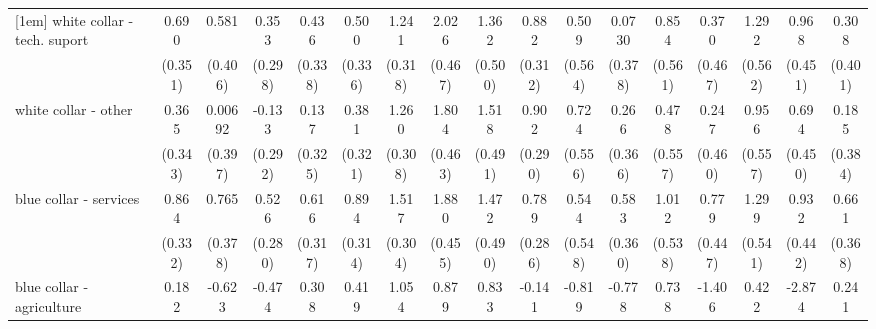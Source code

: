{\begin{tabular}{l*{16}{c}}
[1em]
white collar - tech. suport&       0.690\sym{*}  &       0.581         &       0.353         &       0.436         &       0.500         &       1.241\sym{***}&       2.026\sym{***}&       1.362\sym{**} &       0.882\sym{**} &       0.509         &      0.0730         &       0.854         &       0.370         &       1.292\sym{*}  &       0.968\sym{*}  &       0.308         \\
                    &     (0.351)         &     (0.406)         &     (0.298)         &     (0.338)         &     (0.336)         &     (0.318)         &     (0.467)         &     (0.500)         &     (0.312)         &     (0.564)         &     (0.378)         &     (0.561)         &     (0.467)         &     (0.562)         &     (0.451)         &     (0.401)         \\
[1em]
white collar - other&       0.365         &     0.00692         &      -0.133         &       0.137         &       0.381         &       1.260\sym{***}&       1.804\sym{***}&       1.518\sym{**} &       0.902\sym{**} &       0.724         &       0.266         &       0.478         &       0.247         &       0.956         &       0.694         &       0.185         \\
                    &     (0.343)         &     (0.397)         &     (0.292)         &     (0.325)         &     (0.321)         &     (0.308)         &     (0.463)         &     (0.491)         &     (0.290)         &     (0.556)         &     (0.366)         &     (0.557)         &     (0.460)         &     (0.557)         &     (0.450)         &     (0.384)         \\
[1em]
blue collar - services&       0.864\sym{**} &       0.765\sym{*}  &       0.526         &       0.616         &       0.894\sym{**} &       1.517\sym{***}&       1.880\sym{***}&       1.472\sym{**} &       0.789\sym{**} &       0.544         &       0.583         &       1.012         &       0.779         &       1.299\sym{*}  &       0.932\sym{*}  &       0.661         \\
                    &     (0.332)         &     (0.378)         &     (0.280)         &     (0.317)         &     (0.314)         &     (0.304)         &     (0.455)         &     (0.490)         &     (0.286)         &     (0.548)         &     (0.360)         &     (0.538)         &     (0.447)         &     (0.541)         &     (0.442)         &     (0.368)         \\
[1em]
blue collar - agriculture&       0.182         &      -0.623         &      -0.474         &       0.308         &       0.419         &       1.054\sym{*}  &       0.879         &       0.833         &      -0.141         &      -0.819         &      -0.778         &       0.738         &      -1.406\sym{*}  &       0.422         &      -2.874\sym{***}&       0.241         \\

\end{tabular}}
